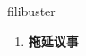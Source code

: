 
\begin{frame}
{\huge filibuster}
\begin{center}
\begin{enumerate}\Large
  \item \textbf{拖延议事}
\end{enumerate}
\end{center}
\end{frame}
